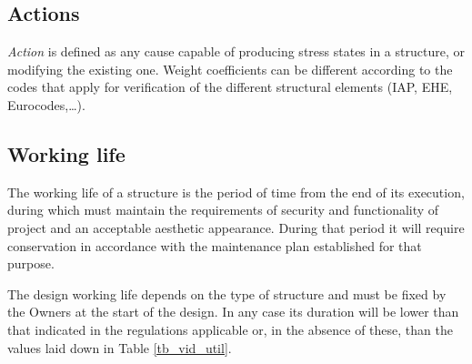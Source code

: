\subsection{Actions}
\emph{Action} is defined as any cause capable of producing stress states in a structure, or modifying the existing one. Weight coefficients can be different according to the codes that apply for verification of the different structural elements (IAP, EHE, Eurocodes,\ldots).

\subsection{Working life} \label{sc_vida_util}
The working life of a structure is the period of time from the end of its execution, during which must maintain the requirements of security and functionality of project and an acceptable aesthetic appearance. During that period it will require conservation in accordance with the maintenance plan established for that purpose.

The design working life depends on the type of structure and must be fixed by the Owners at the start of the design. In any case its duration will be lower than that indicated in the regulations applicable or, in the absence of these, than the values laid down in Table \ref{tb_vid_util}.


